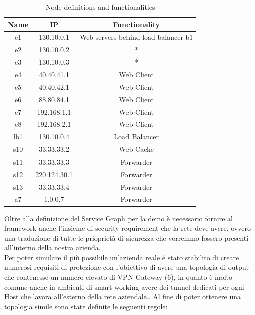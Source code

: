 \begin{table}
    \centering
    \begin{tabular}{ccc}
        \hline
         Name & IP & Functionality \\
        \hline
        e1 & 130.10.0.1 & Web servers behind load balancer b1 \\
        e2 & 130.10.0.2 & * \\
        e3 & 130.10.0.3 & * \\
        e4 & 40.40.41.1 & Web Client \\ 
        e5 & 40.40.42.1 & Web Client \\
        e6 & 88.80.84.1 & Web Client \\
        e7 & 192.168.1.1 & Web Client \\
        e8 & 192.168.2.1 & Web Client \\
        lb1 & 130.10.0.4 & Load Balancer \\
        s10 & 33.33.33.2 & Web Cache \\
        s11 & 33.33.33.3 & Forwarder \\
        s12 & 220.124.30.1 & Forwarder \\
        s13 & 33.33.33.4 & Forwarder \\
        a7 & 1.0.0.7 & Forwarder \\
        \hline
    \end{tabular}
    \caption{Node definitions and functionalities}
    \label{tab:tabella}
\end{table}


Oltre alla definizione del Service Graph per la demo è necessario fornire al framework anche l'insieme di security requirement che la rete deve avere, ovvero una traduzione di tutte le prioprietà di sicurezza che vorremmo fossero presenti all'interno della nostra azienda.\\
Per poter simulare il più possibile un'azienda reale è stato stabilito di creare numerosi requisiti di protezione con l'obiettivo di avere una topologia di output che contenesse un numero elevato di VPN Gateway (6), in quanto è molto comune anche in ambienti di smart working avere dei tunnel dedicati per ogni Host che lavora all'esterno della rete aziendale.. 
Al fine di poter ottenere una topologia simile sono state definite le seguenti regole:\\


